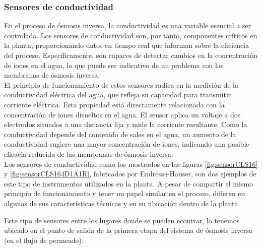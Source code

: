 \subsubsection{Sensores de conductividad} \label{sec:sesor_conductividad}

En el proceso de ósmosis inversa, la conductividad es una variable esencial a ser controlada. Los sensores de 
conductividad son, por tanto, componentes críticos en la planta, proporcionando datos en tiempo real que informan 
sobre la eficiencia del proceso. Específicamente, son capaces de detectar cambios en la concentración de iones 
en el agua, lo que puede ser indicativo de un problema con las membranas de ósmosis inversa.\\

El principio de funcionamiento de estos sensores radica en la medición de la conductividad eléctrica del agua, 
que refleja su capacidad para transmitir corriente eléctrica. Esta propiedad está directamente relacionada 
con la concentración de iones disueltos en el agua. El sensor aplica un voltaje a dos electrodos situados a una 
distancia fija y mide la corriente resultante. Como la conductividad depende del contenido de sales en el agua, 
un aumento de la conductividad sugiere una mayor concentración de iones, indicando una posible eficacia reducida 
de las membranas de ósmosis inversa.\\

Los sensores de conductividad como los mostrados en las figuras \ref{fig:sensorCLS16} y \ref{fig:sensorCLS164D1A1R}, fabricados por Endress+Hauser, son dos ejemplos de este tipo de 
instrumentos utilizados en la planta. A pesar de compartir el mismo principio de funcionamiento y tener un papel 
similar en el proceso, difieren en algunas de sus características técnicas y en su ubicación dentro de la planta.\\


Este tipo de sensores entre los lugares donde se pueden econtrar, lo tenemos ubicado en el punto de salida de la primera 
etapa del sistema de ósmosis inversa (en el flujo de permeado).\\


